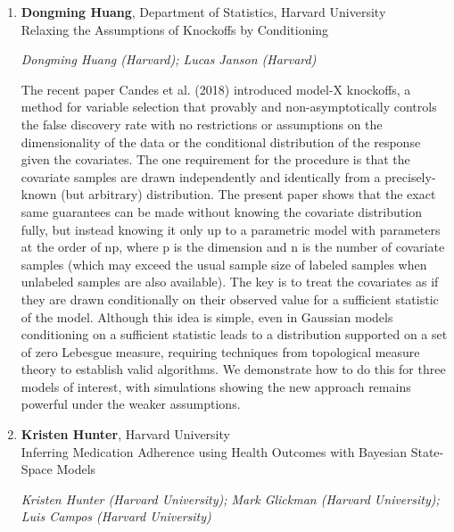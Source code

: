 \begin{enumerate}
\item \textbf{Dongming Huang}, Department of Statistics, Harvard University \\
Relaxing the Assumptions of Knockoffs by Conditioning

\emph{\footnotesize Dongming Huang (Harvard); Lucas Janson (Harvard)}

The recent paper Candes et al. (2018) introduced model-X knockoffs, a method for variable selection that provably and non-asymptotically controls the false discovery rate with no restrictions or assumptions on the dimensionality of the data or the conditional distribution of the response given the covariates. The one requirement for the procedure is that the covariate samples are drawn independently and identically from a precisely-known (but arbitrary) distribution. The present paper shows that the exact same guarantees can be made without knowing the covariate distribution fully, but instead knowing it only up to a parametric model with parameters at the order of np, where p is the dimension and n is the number of covariate samples (which may exceed the usual sample size of labeled samples when unlabeled samples are also available). The key is to treat the covariates as if they are drawn conditionally on their observed value for a sufficient statistic of the model. Although this idea is simple, even in Gaussian models conditioning on a sufficient statistic leads to a distribution supported on a set of zero Lebesgue measure, requiring techniques from topological measure theory to establish valid algorithms. We demonstrate how to do this for three models of interest, with simulations showing the new approach remains powerful under the weaker assumptions.

\item \textbf{Kristen Hunter}, Harvard University \\
Inferring Medication Adherence using Health Outcomes with Bayesian State-Space Models

\emph{\footnotesize Kristen Hunter (Harvard University); Mark Glickman (Harvard University); Luis Campos (Harvard University)}


\end{enumerate}
